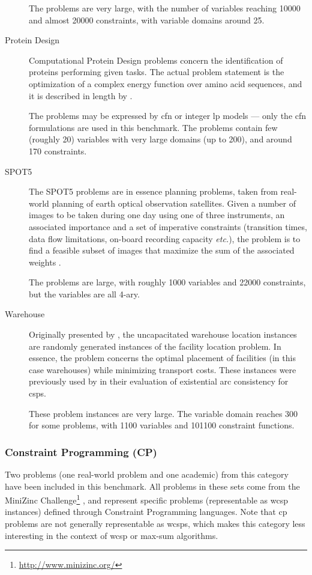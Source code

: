 \begin{description}
		The problems are very large, with the number of variables reaching \num{10000} and almost \num{20000} constraints, with variable domains around \num{25}.

	\item[Protein Design]
		Computational Protein Design problems concern the identification of proteins performing given tasks. The actual problem statement is the optimization of a complex energy function over amino acid sequences, and it is described in length by \textcite{Allouche12}.

		The problems may be expressed by \gls{cfn} or integer \gls{lp} models — only the \gls{cfn} formulations are used in this benchmark. The problems contain few (roughly \num{20}) variables with very large domains (up to \num{200}), and around \num{170} constraints.

	\item[SPOT5]
		The SPOT5 problems are in essence planning problems, taken from real-world planning of earth optical observation satellites.
		Given a number of images to be taken during one day using one of three instruments, an associated importance and a set of imperative constraints (transition times, data flow limitations, on-board recording capacity \emph{etc.}), the problem is to find a feasible subset of images that maximize the sum of the associated weights \parencite{Bensana99}.

		The problems are large, with roughly \num{1000} variables and \num{22000} constraints, but the variables are all 4-ary.

	\item[Warehouse]
		Originally presented by \textcite{Kratica01}, the uncapacitated warehouse location instances are randomly generated instances of the facility location problem. In essence, the problem concerns the optimal placement of facilities (in this case warehouses) while minimizing transport costs. These instances were previously used by \textcite{deGivry05} in their evaluation of existential arc consistency for \glspl{csp}.

		These problem instances are very large. The variable domain reaches \num{300} for some problems, with \num{1100} variables and \num{101100} constraint functions.

\end{description}

\subsubsection{Constraint Programming (CP)}
Two problems (one real-world problem and one academic) from this category have been included in this benchmark.
All problems in these sets come from the MiniZinc Challenge\footnote{\url{http://www.minizinc.org/}} \parencite[\pno~5]{deGivry14}, and represent specific problems (representable as \gls{wcsp} instances) defined through Constraint Programming languages.
Note that \gls{cp} problems are not generally representable as \glspl{wcsp}, which makes this category less interesting in the context of \gls{wcsp} or max-sum algorithms.

